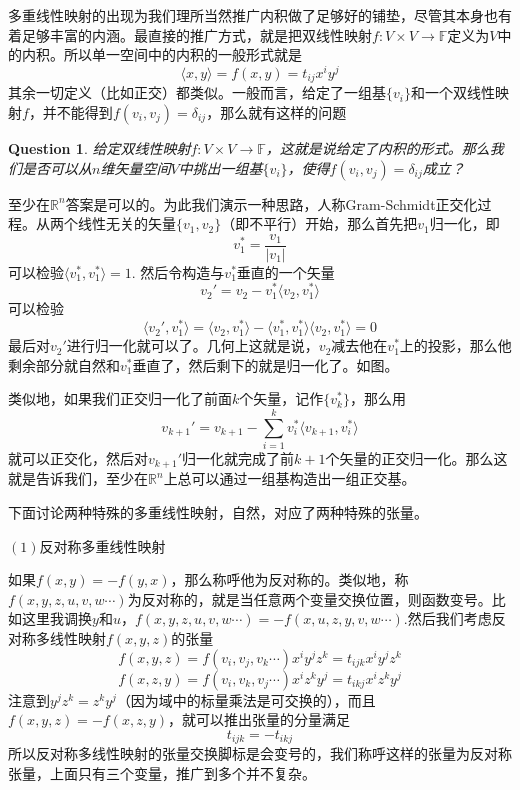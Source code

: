 \documentclass[11pt,a4paper,openany]{book}%
\theoremstyle{plain}%
\newtheorem{que}{Question}[chapter]%
\newcommand{\NO}[1]{{$(#1)$}}%
\begin{document}
多重线性映射的出现为我们理所当然推广内积做了足够好的铺垫，尽管其本身也有着足够丰富的内涵。最直接的推广方式，就是把双线性映射$f:V\times V\rightarrow \mathbb{F}$定义为$V$中的内积。所以单一空间中的内积的一般形式就是
\[
\langle x, y \rangle=f(x,y)=t_{ij}x^iy^j
\]
其余一切定义（比如正交）都类似。一般而言，给定了一组基$\{v_i\}$和一个双线性映射$f$，并不能得到$f(v_i,v_j)=\delta_{ij}$，那么就有这样的问题
\begin{que}
给定双线性映射$f:V\times V\rightarrow \mathbb{F}$，这就是说给定了内积的形式。那么我们是否可以从$n$维矢量空间$V$中挑出一组基$\{v_i\}$，使得$f(v_i,v_j)=\delta_{ij}$成立？
\end{que}
至少在$\mathbb{R}^n$答案是可以的。为此我们演示一种思路，人称Gram-Schmidt正交化过程。从两个线性无关的矢量$\{v_1,v_2\}$（即不平行）开始，那么首先把$v_1$归一化，即
\[
v_1^*=\frac{v_1}{|v_1|}
\]
可以检验$\langle v_1^*, v_1^* \rangle=1$.
然后令构造与$v_1^*$垂直的一个矢量
\[
v_2'=v_2-v_1^*\langle v_2, v_1^* \rangle 
\]
可以检验
\[
\langle v_2', v_1^* \rangle=\langle v_2, v_1^* \rangle-\langle v_1^*, v_1^* \rangle\langle v_2, v_1^* \rangle =0
\]
最后对$v_2'$进行归一化就可以了。几何上这就是说，$v_2$减去他在$v_1^*$上的投影，那么他剩余部分就自然和$v_1^*$垂直了，然后剩下的就是归一化了。如图。\\
\begin{center}
\end{center}
类似地，如果我们正交归一化了前面$k$个矢量，记作$\{v_k^*\}$，那么用
\[
v_{k+1}'=v_{k+1}-\sum_{i=1}^kv_i^* \langle v_{k+1}, v_i^* \rangle 
\]
就可以正交化，然后对$v_{k+1}'$归一化就完成了前$k+1$个矢量的正交归一化。那么这就是告诉我们，至少在$\mathbb{R}^n$上总可以通过一组基构造出一组正交基。

下面讨论两种特殊的多重线性映射，自然，对应了两种特殊的张量。

\NO{1}反对称多重线性映射

如果$f(x,y)=-f(y,x)$，那么称呼他为{\kaishu 反对称}的。类似地，称$f(x,y,z,u,v,w\cdots)$为反对称的，就是当任意两个变量交换位置，则函数变号。比如这里我调换$y$和$u$，$f(x,y,z,u,v,w\cdots)=-f(x,u,z,y,v,w\cdots)$.然后我们考虑反对称多线性映射$f(x,y,z)$的张量
\[
f(x,y,z)=f(v_i,v_j,v_k\cdots)x^iy^jz^k=t_{ijk}x^iy^jz^k
\]
\[
f(x,z,y)=f(v_i,v_k,v_j\cdots)x^iz^ky^j=t_{ikj}x^iz^ky^j
\]
注意到$y^jz^k=z^ky^j$（因为域中的标量乘法是可交换的），而且$f(x,y,z)=-f(x,z,y)$，就可以推出张量的分量满足
\[
t_{ijk}=-t_{ikj}
\]
所以反对称多线性映射的张量交换脚标是会变号的，我们称呼这样的张量为反对称张量，上面只有三个变量，推广到多个并不复杂。
\end{document}
